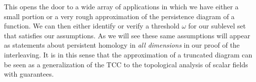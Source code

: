 %

This opens the door to a wide array of applications in which we have either a small portion or a very rough approximation of the persistence diagram of a function.
We can then either identify or verify a threshold $\omega$ for our sublevel set that satisfies our assumptions.
As we will see these same assumptions will appear as statements about persistent homology in \emph{all dimensions} in our proof of the interleaving.
It is in this sense that the approximation of a truncated diagram can be seen as a generalization of the TCC to the topological analysis of scalar fields with guarantees.

